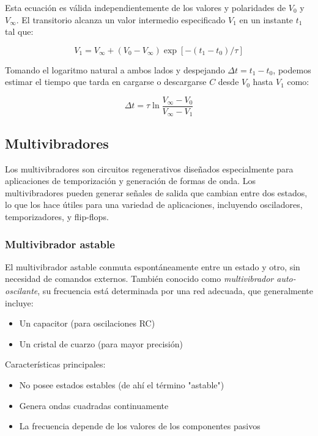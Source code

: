 Esta ecuación es válida independientemente de los valores y polaridades de $V_0$ y $V_\infty$. El transitorio alcanza un valor intermedio especificado $V_1$ en un instante $t_1$ tal que:

\[
V_1 = V_\infty + (V_0 - V_\infty) \exp[-(t_1 - t_0)/\tau]
\]

Tomando el logaritmo natural a ambos lados y despejando $\Delta t = t_1 - t_0$, podemos estimar el tiempo que tarda en cargarse o descargarse $C$ desde $V_0$ hasta $V_1$ como:

\begin{equation}
\Delta t = \tau \ln \frac{V_{\infty} - V_0}{V_{\infty} - V_1}
\label{eq:tiempo_carga-exponencial}
\end{equation}

\subsection{Multivibradores}

Los multivibradores son circuitos regenerativos diseñados especialmente para aplicaciones de temporización y generación de formas de onda. Los multivibradores 
pueden generar señales de salida que cambian entre dos estados, lo que los hace útiles para una variedad de aplicaciones, incluyendo osciladores, temporizadores, y flip-flops.

\subsubsection{Multivibrador astable}

El multivibrador astable conmuta espontáneamente entre un estado y otro, sin necesidad de comandos externos. También conocido como \emph{multivibrador auto-oscilante}, su frecuencia está determinada por una red adecuada, que generalmente incluye:

\begin{itemize}
    \item Un capacitor (para oscilaciones RC)
    \item Un cristal de cuarzo (para mayor precisión)
\end{itemize}

Características principales:
\begin{itemize}
    \item No posee estados estables (de ahí el término "astable")
    \item Genera ondas cuadradas continuamente
    \item La frecuencia depende de los valores de los componentes pasivos
\end{itemize}

